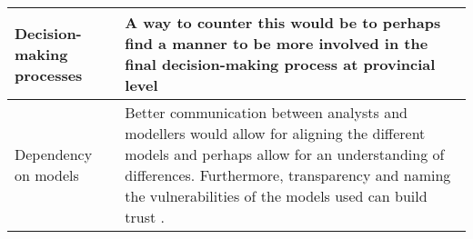 \begin{table}[h]
\begin{tabular}{p{}|p{}}
Decision-making processes & A way to counter this would be to perhaps find a manner to be more involved in the final decision-making process at provincial level   \\ \hline
Dependency on models &  Better communication between analysts and modellers would allow for aligning the different models and perhaps allow for an understanding of differences. Furthermore, transparency and naming the vulnerabilities of the models used can build trust \parencite{saltelli_five_2020}.               
\end{tabular}
\end{table}